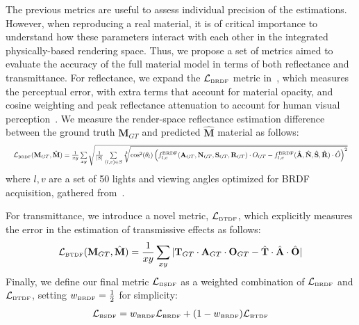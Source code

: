The previous metrics are useful to assess individual precision of the estimations. However, when reproducing a real material, it is of critical  importance to understand how these parameters interact with each other in the integrated physically-based rendering space. Thus, we propose a set of metrics aimed to evaluate the accuracy of the full material model in terms of both reflectance and transmittance. 
For reflectance, we expand the $\mathcal{L}_{\text{\tiny{BRDF}}}$ metric in~\cite{rodriguezpardo2023UMat}, which measures the perceptual error, with extra terms that account for material opacity, and cosine weighting and peak reflectance attenuation to account for human visual perception~\cite{lavoue2021perceptual}. 
We measure the render-space reflectance estimation difference between the ground truth $\mathbf{M}_{GT}$ and predicted $\hat{\mathbf{M}}$ material as follows:
\begin{align} \label{eq:brdf}
	\resizebox{\hsize}{!}{$\mathcal{L}_{\text{\tiny{BRDF}}} (\mathbf{M}_{GT},\hat{\mathbf{M}}) = \frac{1}{xy} \sum\limits_{xy} \sqrt{ \frac{1}{|S|}\sum\limits_{(l, v) \in S } \sqrt[3]{\cos^2(\theta_l) \left( f_{l,v}^\textrm{BRDF}(\mathbf{A}_{GT},\mathbf{N}_{GT},\mathbf{S}_{GT},\mathbf{R}_{GT})\cdot O_{GT} - f_{l,v}^\textrm{BRDF}(\hat{\mathbf{A}},\hat{\mathbf{N}},\hat{\mathbf{S}}, \hat{\mathbf{R}}) \cdot \hat{O}\right)^2}}$}
\end{align}
where $l,v$ are a set of 50 lights and viewing angles optimized for BRDF acquisition, gathered from~\cite{nielsen2015optimal}. 

For transmittance, we introduce a novel metric, $\mathcal{L}_{\text{\tiny{BTDF}}}$, which explicitly measures the error in the estimation of transmissive effects as follows: 
\begin{align}
\label{ec:ell_svbrdf}
       \mathcal{L}_{\text{\tiny{BTDF}}} (\mathbf{M}_{GT},\hat{\mathbf{M}})= \frac{1}{xy} \sum\limits_{xy} |  \mathbf{T}_{GT} \cdot \mathbf{A}_{GT} \cdot \mathbf{O}_{GT}  - \hat{\mathbf{T}} \cdot \hat{\mathbf{A}} \cdot \hat{\mathbf{O}} | 
\end{align}
Finally, we define our final metric $\mathcal{L}_{\text{\tiny{BSDF}}}$ as a weighted combination of $\mathcal{L}_{\text{\tiny{BRDF}}}$ and $\mathcal{L}_{\text{\tiny{BTDF}}}$, setting $w_{\text{\tiny{BRDF}}}  = \frac{1}{2}$ for simplicity: 
\begin{align}
\label{ec:ell_svbsdf}
       \mathcal{L}_{\text{\tiny{BSDF}}} = w_{\text{\tiny{BRDF}}} \mathcal{L}_{\text{\tiny{BRDF}}} +  (1-w_{\text{\tiny{BRDF}}}) \mathcal{L}_{\text{\tiny{BTDF}}}  
\end{align}

